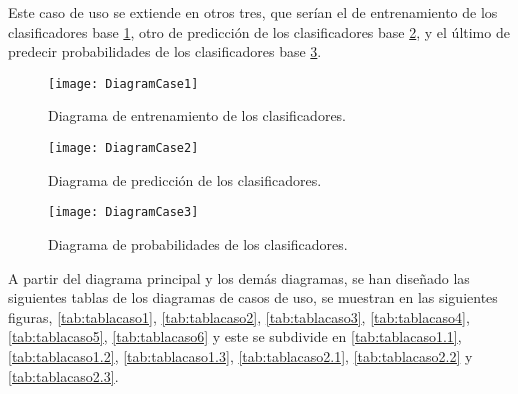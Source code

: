 Este caso de uso se extiende en otros tres, que serían el de entrenamiento de los clasificadores base \ref{fig:DiagramCase1}, otro de predicción de los clasificadores base \ref{fig:DiagramCase2}, y el último de predecir probabilidades de los clasificadores base \ref{fig:DiagramCase3}.	

\begin{figure}
\centering
\texttt{[image: DiagramCase1]}
\caption{Diagrama de entrenamiento de los clasificadores.}
\label{fig:DiagramCase1}
\end{figure}

\begin{figure}
\centering
\texttt{[image: DiagramCase2]}
\caption{Diagrama de predicción de los clasificadores.}
\label{fig:DiagramCase2}
\end{figure}

\begin{figure}
\centering
\texttt{[image: DiagramCase3]}
\caption{Diagrama de probabilidades de los clasificadores.}
\label{fig:DiagramCase3}
\end{figure}

A partir del diagrama principal y los demás diagramas, se han diseñado las siguientes tablas de los diagramas de casos de uso, se muestran en las siguientes figuras, \ref{tab:tablacaso1}, \ref{tab:tablacaso2}, \ref{tab:tablacaso3}, \ref{tab:tablacaso4}, \ref{tab:tablacaso5}, \ref{tab:tablacaso6} y este se subdivide en \ref{tab:tablacaso1.1}, \ref{tab:tablacaso1.2}, \ref{tab:tablacaso1.3}, \ref{tab:tablacaso2.1}, \ref{tab:tablacaso2.2} y \ref{tab:tablacaso2.3}.

